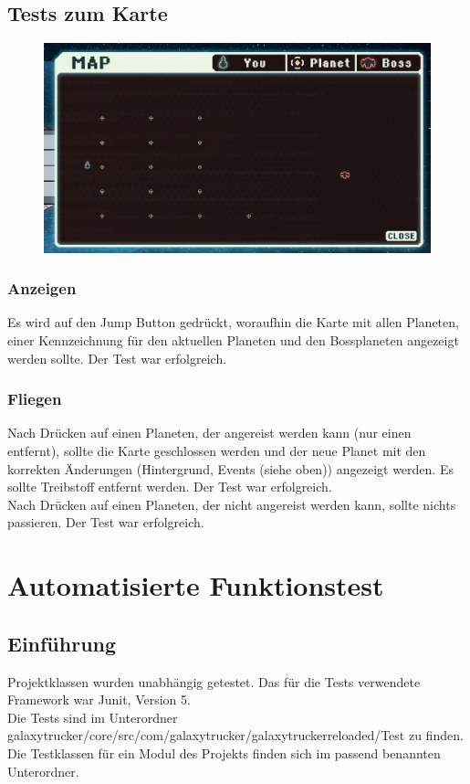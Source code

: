 \documentclass[fontsize=12pt,paper=a4,twoside]{scrartcl}
\begin{document}
\subsection{Tests zum Karte}
\begin{figure}[h!]
\centering
\includegraphics[width=0.5\linewidth]{images/map.png}
\end{figure}
\subsubsection{Anzeigen}
Es wird auf den Jump Button gedrückt, woraufhin die Karte mit allen Planeten, einer Kennzeichnung für den aktuellen Planeten und den Bossplaneten angezeigt werden sollte.  Der Test war erfolgreich. \\
\subsubsection{Fliegen}
Nach Drücken auf einen Planeten, der angereist werden kann (nur einen entfernt), sollte die Karte geschlossen werden und der neue Planet mit den korrekten Änderungen (Hintergrund, Events (siehe oben)) angezeigt werden. Es sollte Treibstoff entfernt werden.  Der Test war erfolgreich. \\
Nach Drücken auf einen Planeten, der nicht angereist werden kann, sollte nichts passieren.  Der Test war erfolgreich. \\

\section{Automatisierte Funktionstest}
\subsection{Einführung}
Projektklassen wurden unabhängig getestet. Das für die Tests verwendete Framework war Junit, Version 5. \\
Die Tests sind im Unterordner galaxytrucker/core/src/com/galaxytrucker/galaxytruckerreloaded/Test zu finden. Die Testklassen für ein Modul des Projekts finden sich im passend benannten Unterordner. \\
\end{document}
